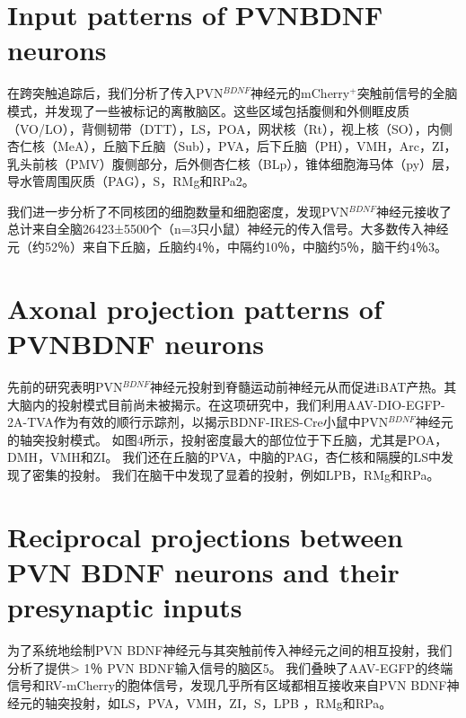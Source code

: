 \section{Input patterns of PVNBDNF neurons}
在跨突触追踪后，我们分析了传入PVN$^{BDNF}$神经元的mCherry$^{+}$突触前信号的全脑模式，并发现了一些被标记的离散脑区。这些区域包括腹侧和外侧眶皮质（VO/LO），背侧韧带（DTT），LS，POA，网状核（Rt），视上核（SO），内侧杏仁核（MeA），丘脑下丘脑（Sub），PVA，后下丘脑（PH），VMH，Arc，ZI，乳头前核（PMV）腹侧部分，后外侧杏仁核（BLp），锥体细胞海马体（py）层，导水管周围灰质（PAG），S，RMg和RPa\figurename{2}。

我们进一步分析了不同核团的细胞数量和细胞密度，发现PVN$^{BDNF}$神经元接收了总计来自全脑26423±5500个（n=3只小鼠）神经元的传入信号。大多数传入神经元（约52％）来自下丘脑，丘脑约4％，中隔约10％，中脑约5％，脑干约4％\figurename{3}。

\section{Axonal projection patterns of PVNBDNF neurons}
先前的研究表明PVN$^{BDNF}$神经元投射到脊髓运动前神经元从而促进iBAT产热\citep{an2015discrete}。其大脑内的投射模式目前尚未被揭示。在这项研究中，我们利用AAV-DIO-EGFP-2A-TVA作为有效的顺行示踪剂，以揭示BDNF-IRES-Cre小鼠中PVN$^{BDNF}$神经元的轴突投射模式。 如图4所示，投射密度最大的部位位于下丘脑，尤其是POA，DMH，VMH和ZI。 我们还在丘脑的PVA，中脑的PAG，杏仁核和隔膜的LS中发现了密集的投射。 我们在脑干中发现了显着的投射，例如LPB，RMg和RPa。

\section{Reciprocal projections between PVN BDNF neurons and their presynaptic inputs}
为了系统地绘制PVN BDNF神经元与其突触前传入神经元之间的相互投射，我们分析了提供> 1％ PVN BDNF输入信号的脑区\figurename{5}。 我们叠映了AAV-EGFP的终端信号和RV-mCherry的胞体信号，发现几乎所有区域都相互接收来自PVN BDNF神经元的轴突投射，如LS，PVA，VMH，ZI，S，LPB ，RMg和RPa。